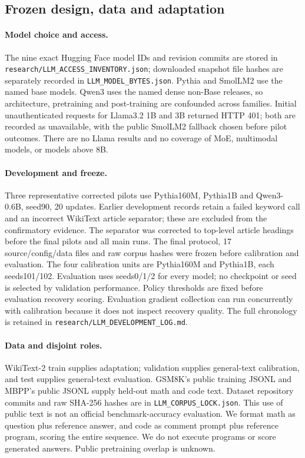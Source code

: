 \subsection{Frozen design, data and adaptation}

\paragraph{Model choice and access.}
The nine exact Hugging Face model IDs and revision commits are stored in
\texttt{research/LLM\_ACCESS\_INVENTORY.json}; downloaded snapshot file
 hashes are separately recorded in \texttt{LLM\_MODEL\_BYTES.json}.
Pythia and SmolLM2 use the named base models. Qwen3 uses the named dense
 non-Base releases, so architecture, pretraining and post-training are
 confounded across families. Initial unauthenticated requests for Llama3.2
1B and 3B returned HTTP 401; both are recorded as unavailable, with the
 public SmolLM2 fallback chosen before pilot outcomes. There are no Llama
 results and no coverage of MoE, multimodal models, or models above 8B.

\paragraph{Development and freeze.}
Three representative corrected pilots use Pythia160M, Pythia1B and
Qwen3-0.6B, seed90, 20 updates. Earlier development records retain a
 failed keyword call and an incorrect WikiText article separator; these
 are excluded from the confirmatory evidence. The separator was corrected
 to top-level article headings before the final pilots and all main runs.
The final protocol, 17 source/config/data files and raw corpus hashes were
 frozen before calibration and evaluation. The four calibration units are
Pythia160M and Pythia1B, each seeds101/102. Evaluation uses seeds0/1/2 for
 every model; no checkpoint or seed is selected by validation performance.
Policy thresholds are fixed before evaluation recovery scoring. Evaluation
 gradient collection can run concurrently with calibration because it does
 not inspect recovery quality. The full chronology is retained in
\texttt{research/LLM\_DEVELOPMENT\_LOG.md}.

\paragraph{Data and disjoint roles.}
WikiText-2 train supplies adaptation; validation supplies general-text
 calibration, and test supplies general-text evaluation. GSM8K's public
 training JSONL and MBPP's public JSONL supply held-out math and code text.
Dataset repository commits and raw SHA-256 hashes are in
\texttt{LLM\_CORPUS\_LOCK.json}. This use of public text is not an official
 benchmark-accuracy evaluation. We format math as question plus reference
 answer, and code as comment prompt plus reference program, scoring the
 entire sequence. We do not execute programs or score generated answers.
Public pretraining overlap is unknown.

